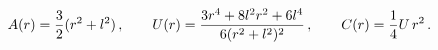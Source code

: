 \begin{equation}
  A(r)={3\over 2}(r^2+l^2)\,, \qquad
  U(r)={3 r^4 + 8 l^2 r^2 + 6 l^4 \over {6(r^2+l^2)^2}} \,,\qquad
  C(r)=\frac14 U\,r^2\,.
 \label{defA}
\end{equation}

